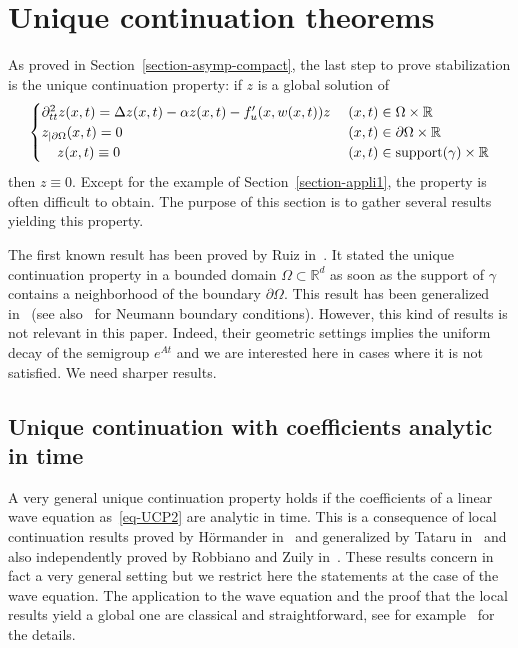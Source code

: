 \documentclass[AHL,Unicode,longabstracts]{cedram}
\newcommand{\RR}{\mathbb{R}}
\begin{document}
\section{Unique continuation theorems}\label{section-UCP}
As proved in Section~\ref{section-asymp-compact}, the last step to prove stabilization is the unique continuation property: if $z$ is a global solution of
\begin{equation}\label{eq-UCP2}
\begin{cases}
\partial_{tt}^2 z(x,t) = \Delta z(x,t) - \alpha z(x,t) - f'_u(x,w(x,t)) z\;&(x,t)\in\Omega\times\RR\\
z_{|\partial\Omega}(x,t)=0&(x,t)\in\partial\Omega\times \RR\\
\mkern20mu z(x,t)\equiv 0 & (x,t)\in \text{support}(\gamma)\times \RR
\end{cases}
\end{equation}
then $z\equiv 0$. Except for the example of Section~\ref{section-appli1}, the property is often difficult to obtain. The purpose of this section is to gather several results yielding this property.

The first known result has been proved by Ruiz in~\cite{Ruiz}. It stated the unique continuation property in a bounded domain $\Omega \subset\RR^d$ as soon as the support of $\gamma$ contains a neighborhood of the boundary $\partial\Omega$. This result has been generalized in~\cite{K-K} (see also~\cite{Las-Tri-Zha} for Neumann boundary conditions). However, this kind of results is not relevant in this paper. Indeed, their geometric settings implies the uniform decay of the semigroup $e^{At}$ and we are interested here in cases where it is not satisfied. We need sharper results.


\subsection{Unique continuation with coefficients analytic in time}

A very general unique continuation property holds if the coefficients of a linear wave equation as~\eqref{eq-UCP2} are analytic in time. This is a consequence of local continuation results proved by H\"ormander in~\cite{Hormander_uniq_analytic} and generalized by Tataru in~\cite{Tataru_uniq_analyticJMPA} and also independently proved by Robbiano and Zuily in~\cite{Rob-Zui}. These results concern in fact a very general setting but we restrict here the statements at the case of the wave equation. The application to the wave equation and the proof that the local results yield a global one are classical and straightforward, see for example~\cite[Corollary~3.2]{RC} for the details.
\end{document}
